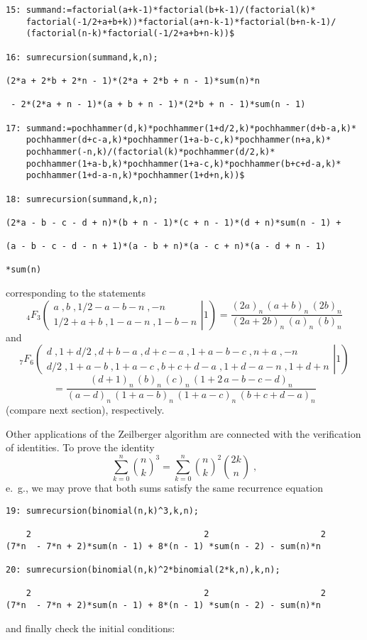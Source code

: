 {\small
\begin{verbatim}
15: summand:=factorial(a+k-1)*factorial(b+k-1)/(factorial(k)*
    factorial(-1/2+a+b+k))*factorial(a+n-k-1)*factorial(b+n-k-1)/
    (factorial(n-k)*factorial(-1/2+a+b+n-k))$

16: sumrecursion(summand,k,n);

(2*a + 2*b + 2*n - 1)*(2*a + 2*b + n - 1)*sum(n)*n

 - 2*(2*a + n - 1)*(a + b + n - 1)*(2*b + n - 1)*sum(n - 1)

17: summand:=pochhammer(d,k)*pochhammer(1+d/2,k)*pochhammer(d+b-a,k)*
    pochhammer(d+c-a,k)*pochhammer(1+a-b-c,k)*pochhammer(n+a,k)*
    pochhammer(-n,k)/(factorial(k)*pochhammer(d/2,k)*
    pochhammer(1+a-b,k)*pochhammer(1+a-c,k)*pochhammer(b+c+d-a,k)*
    pochhammer(1+d-a-n,k)*pochhammer(1+d+n,k))$

18: sumrecursion(summand,k,n);

(2*a - b - c - d + n)*(b + n - 1)*(c + n - 1)*(d + n)*sum(n - 1) +

(a - b - c - d - n + 1)*(a - b + n)*(a - c + n)*(a - d + n - 1)

*sum(n)
\end{verbatim}
}\noindent
corresponding to the statements
\[
_4 F_3\left.
\left(
\begin{array}{c}
a\;, b\;, 1/2-a-b-n\;, -n\\[1mm]
1/2+a+b \;, 1-a-n\;, 1-b-n
\end{array}
\right| 1\right)
=\frac{(2a)_n\,(a+b)_n\,(2b)_n}
{(2a+2b)_n\,(a)_n\,(b)_n}
\]
and
\[
_7 F_6\left.
\left(
\begin{array}{c}
d\;, 1+d/2\;, d+b-a\;, d+c-a\;, 1+a-b-c\;, n+a\;, -n\\[1mm]
d/2\;, 1+a-b\;, 1+a-c\;, b+c+d-a \;, 1+d-a-n\;, 1+d+n
\end{array}
\right| 1\right)
\]
\[
=\frac{(d+1)_n\,(b)_n\,(c)_n\,(1+2\,a-b-c-d)_n}
{(a-d)_n\,(1+a-b)_n\,(1+a-c)_n\,(b+c+d-a)_n}
\]
(compare next section), respectively.

Other applications of the Zeilberger algorithm are connected with
the verification of identities. To prove the identity
\[
\sum_{k=0}^n
\binom{n}{k}^3
=
\sum_{k=0}^n
\binom{n}{k}^2 \binom{2k}{n}
\;,
\]
e.\ g., we may prove that both sums satisfy the same recurrence equation

{\small
\begin{verbatim}
19: sumrecursion(binomial(n,k)^3,k,n);

    2                                  2                      2
(7*n  - 7*n + 2)*sum(n - 1) + 8*(n - 1) *sum(n - 2) - sum(n)*n

20: sumrecursion(binomial(n,k)^2*binomial(2*k,n),k,n);

    2                                  2                      2
(7*n  - 7*n + 2)*sum(n - 1) + 8*(n - 1) *sum(n - 2) - sum(n)*n
\end{verbatim}
}\noindent
and finally check the initial conditions:

